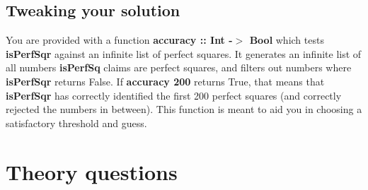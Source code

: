 \documentclass{article}
\begin{document}
\subsection{Tweaking your solution}
You are provided with a function \textbf{accuracy :: Int -$>$ Bool} which tests \textbf{isPerfSqr} against an infinite list of perfect squares. It generates an infinite list of all numbers \textbf{isPerfSq} claims are perfect squares, and filters out numbers where \textbf{isPerfSqr} returns False. If \textbf{accuracy 200} returns True, that means that \textbf{isPerfSqr} has correctly identified the first 200 perfect squares (and correctly rejected the numbers in between). This function is meant to aid you in choosing a satisfactory threshold and guess.

\section{Theory questions}
\end{document}
